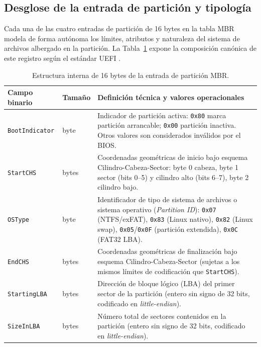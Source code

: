 \documentclass[12pt]{article}
\begin{document}
\subsection{Desglose de la entrada de partición y tipología}
\label{subsec:desgloseEntradaMbr}

Cada una de las cuatro entradas de partición de 16 bytes en la tabla MBR modela de forma autónoma los límites, atributos y naturaleza del sistema de archivos albergado en la partición. La Tabla~\ref{tab:entradaParticionMbr} expone la composición canónica de este registro según el estándar UEFI \parencite[\S 5.2.1, p.\ 111]{uefi2024specification}.

\begin{table}[!t]
\centering
\small
\renewcommand{\arraystretch}{1.1}
\renewcommand{\tabularxcolumn}[1]{m{#1}}
\setlength{\emergencystretch}{1.5em}
\caption{Estructura interna de 16 bytes de la entrada de partición MBR.}
\label{tab:entradaParticionMbr}
\begin{tabularx}{\textwidth}{>{\centering\arraybackslash}m{3.0cm} >{\centering\arraybackslash}m{1.8cm} X}
\toprule
\textbf{Campo binario} & \textbf{Tamaño} & \textbf{Definición técnica y valores operacionales} \\
\midrule
\texttt{BootIndicator} & 1 byte & Indicador de partición activa: \texttt{0x80} marca partición arrancable; \texttt{0x00} partición inactiva. Otros valores son considerados inválidos por el BIOS. \\
\addlinespace
\texttt{StartCHS} & 3 bytes & Coordenadas geométricas de inicio bajo esquema Cilindro-Cabeza-Sector: byte 0 cabeza, byte 1 sector (bits 0--5) y cilindro alto (bits 6--7), byte 2 cilindro bajo. \\
\addlinespace
\texttt{OSType} & 1 byte & Identificador de tipo de sistema de archivos o sistema operativo (\textit{Partition ID}): \texttt{0x07} (NTFS/exFAT), \texttt{0x83} (Linux nativo), \texttt{0x82} (Linux swap), \texttt{0x05}/\texttt{0x0F} (partición extendida), \texttt{0x0C} (FAT32 LBA). \\
\addlinespace
\texttt{EndCHS} & 3 bytes & Coordenadas geométricas de finalización bajo esquema Cilindro-Cabeza-Sector (sujetas a los mismos límites de codificación que \texttt{StartCHS}). \\
\addlinespace
\texttt{StartingLBA} & 4 bytes & Dirección de bloque lógico (LBA) del primer sector de la partición (entero sin signo de 32 bits, codificado en \textit{little-endian}). \\
\addlinespace
\texttt{SizeInLBA} & 4 bytes & Número total de sectores contenidos en la partición (entero sin signo de 32 bits, codificado en \textit{little-endian}). \\
\bottomrule
\end{tabularx}
\end{table}
\end{document}
